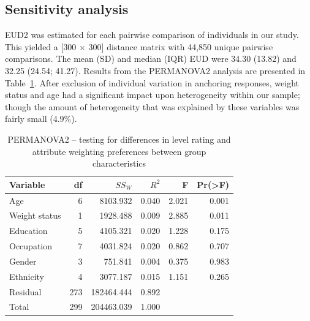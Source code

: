 \documentclass[
  number,
  preprint]{elsarticle}
\begin{document}
\subsection{Sensitivity analysis}\label{sensitivity-analysis-1}

EUD2 was estimated for each pairwise comparison of individuals in our
study. This yielded a {[}300 \(\times\) 300{]} distance matrix with
44,850 unique pairwise comparisons. The mean (SD) and median (IQR) EUD
were 34.30 (13.82) and 32.25 (24.54; 41.27). Results from the PERMANOVA2
analysis are presented in Table~\ref{tbl-permanova2}. After exclusion of
individual variation in anchoring responses, weight status and age had a
significant impact upon heterogeneity within our sample; though the
amount of heterogeneity that was explained by these variables was fairly
small (4.9\%).

\begin{longtable}[]{@{}lrrrrr@{}}

\caption{\label{tbl-permanova2}PERMANOVA2 -- testing for differences in
level rating and attribute weighting preferences between group
characteristics}

\tabularnewline

\toprule\noalign{}
Variable & df & \(SS_W\) & \(R^2\) & F & Pr(\textgreater F) \\
\midrule\noalign{}
\endhead
\bottomrule\noalign{}
\endlastfoot
Age & 6 & 8103.932 & 0.040 & 2.021 & 0.001 \\
Weight status & 1 & 1928.488 & 0.009 & 2.885 & 0.011 \\
Education & 5 & 4105.321 & 0.020 & 1.228 & 0.175 \\
Occupation & 7 & 4031.824 & 0.020 & 0.862 & 0.707 \\
Gender & 3 & 751.841 & 0.004 & 0.375 & 0.983 \\
Ethnicity & 4 & 3077.187 & 0.015 & 1.151 & 0.265 \\
Residual & 273 & 182464.444 & 0.892 & & \\
Total & 299 & 204463.039 & 1.000 & & \\

\end{longtable}
\end{document}
